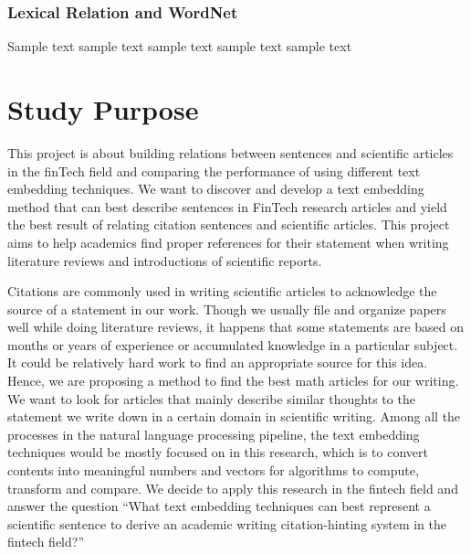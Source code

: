 \subsubsection{Lexical Relation and WordNet}
Sample text sample text sample text sample text sample text

\section{Study Purpose}
This project is about building relations between sentences and scientific articles in the finTech field and comparing the performance of using different text embedding techniques.
We want to discover and develop a text embedding method that can best describe sentences in FinTech research articles and yield the best result of relating citation sentences and scientific articles.
This project aims to help academics find proper references for their statement when writing literature reviews and introductions of scientific reports.

Citations are commonly used in writing scientific articles to acknowledge the source of a statement in our work.
Though we usually file and organize papers well while doing literature reviews, it happens that some statements are based on months or years of experience or accumulated knowledge in a particular subject.
It could be relatively hard work to find an appropriate source for this idea.
Hence, we are proposing a method to find the best math articles for our writing.
We want to look for articles that mainly describe similar thoughts to the statement we write down in a certain domain in scientific writing.
Among all the processes in the natural language processing pipeline, the text embedding techniques would be mostly focused on in this research, which is to convert contents into meaningful numbers and vectors for algorithms to compute, transform and compare.
We decide to apply this research in the fintech field and answer the question “What text embedding techniques can best represent a scientific sentence to derive an academic writing citation-hinting system in the fintech field?”